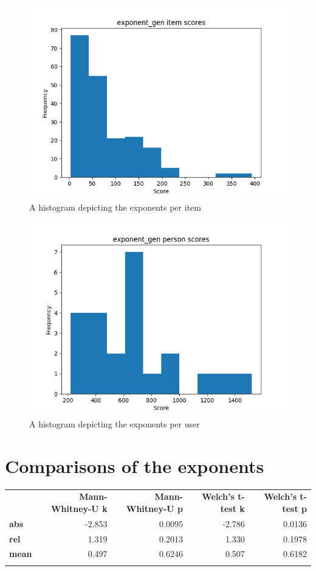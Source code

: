 \begin{figure}
    \centering
    \includegraphics[width=.7\textwidth]{img/exponent_gen_diff.png}
    \caption{A histogram depicting the exponents per item}
    \label{fig:exponent_gen_diff}
\end{figure}
\begin{figure}
    \centering
    \includegraphics[width=.7\textwidth]{img/exponent_gen_abil.png}
    \caption{A histogram depicting the exponents per user}
    \label{fig:exponent_gen_abil}
\end{figure}

\section{Comparisons of the exponents}

\begin{longtable}[c]{@{}lrrrr@{}}
\toprule\addlinespace
& \textbf{Mann-Whitney-U k} & \textbf{Mann-Whitney-U p} &
\textbf{Welch's t-test k} & \textbf{Welch's t-test p}
\\\addlinespace
\midrule\endhead
\textbf{abs} & -2.853 & 0.0095 & -2.786 & 0.0136
\\\addlinespace
\textbf{rel} & 1.319 & 0.2013 & 1.330 & 0.1978
\\\addlinespace
\textbf{mean} & 0.497 & 0.6246 & 0.507 & 0.6182
\\\addlinespace
\bottomrule
    \label{tab:exponent_comp}
\end{longtable}

